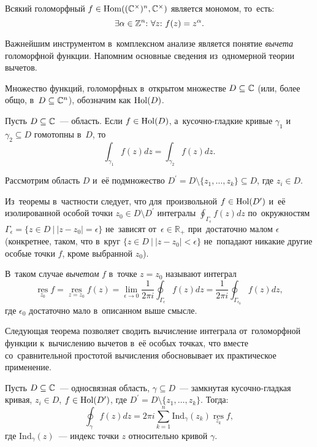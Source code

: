 \documentclass{article}
\begin{document}
\begin{theorem*}
    Всякий голоморфный $f \in \mathrm{Hom}((\mathbb{C}^\times)^n, \mathbb{C}^\times)$ является мономом, то~есть:
    $$
        \exists \alpha \in \mathbb{Z}^n{:}\ \forall z{:}\ f(z) = z^\alpha.
    $$
\end{theorem*}


Важнейшим инструментом в~комплексном анализе является понятие \textit{вычета} голоморфной функции.
Напомним основные сведения из~одномерной теории вычетов.

Множество функций, голоморфных в~открытом множестве $D \subseteq \mathbb{C}$ (или, более общо, в~$D \subseteq \mathbb{C}^n$), обозначим как $\mathrm{Hol}(D)$.

\begin{theorem*}
  Пусть $D \subseteq \mathbb{C}$~— область. Если $f \in \mathrm{Hol}(D)$, а~кусочно-гладкие кривые $\gamma_1$
  и~$\gamma_2 \subseteq D$ гомотопны в~$D$, то
  $$
    \int_{\gamma_1} f(z)dz = \int_{\gamma_2} f(z)dz.
  $$
\end{theorem*}

Рассмотрим область $D$ и~её подмножество $D^\prime = D \setminus \{ z_1, \ldots, z_k \} \subseteq D$, где $z_i \in D$.

Из~теоремы в~частности следует, что для~произвольной $f \in \mathrm{Hol}(D^\prime)$ и~её изолированной
особой точки $z_0 \in D \setminus D^\prime$ интегралы $\oint_{\Gamma_\epsilon} f(z)dz$ по~окружностям
$\Gamma_\epsilon = \{ z \in D \ | \ |z - z_0| = \epsilon \}$ не~зависят от~$\epsilon \in \mathbb{R}_{+}$
при~достаточно малом $\epsilon$ (конкретнее, таком, что в~круг $\{ z \in D \ | \ |z - z_0| < \epsilon \}$
не~попадают никакие другие особые точки $f$, кроме выбранной $z_0$).

В~таком случае \textit{вычетом} $f$ в~точке $z = z_0$ называют интеграл
$$
  \operatorname*{res}\limits_{z_0} f = \operatorname*{res}\limits_{z = z_0} f(z) = \lim\limits_{\epsilon \to 0} \frac{1}{2 \pi i} \oint_{\Gamma_\epsilon} f(z)dz = \frac{1}{2 \pi i} \oint_{\Gamma_{\epsilon_0}} f(z)dz,
$$
где $\epsilon_0$ достаточно мало в~описанном выше смысле.

Следующая теорема позволяет сводить вычисление интеграла от~голоморфной функции к~вычислению вычетов в~её особых точках,
что вместе со~сравнительной простотой вычисления обосновывает их практическое применение.
\begin{theorem*}
  Пусть $D \subseteq \mathbb{C}$~— односвязная область, $\gamma \subseteq D$~— замкнутая кусочно-гладкая кривая,
  $z_i \in D$, $f \in \mathrm{Hol}(D^\prime)$, где $D^\prime = D \setminus \{ z_1, \ldots, z_k \}$.
  Тогда:
  $$
    \oint_{\gamma} f(z)dz = 2 \pi i \sum_{k = 1}^{n} \mathrm{Ind}_{\gamma}(z_k) \operatorname*{res}\limits_{z_k} f,
  $$
  где $\mathrm{Ind}_{\gamma}(z)$~— индекс точки $z$ относительно кривой $\gamma$.
\end{theorem*}
\end{document}
